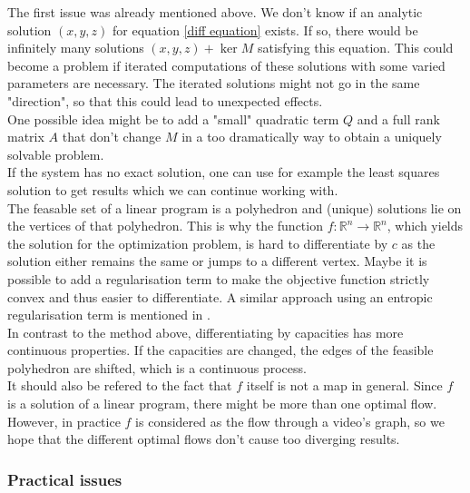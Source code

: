 \documentclass{article}
\begin{document}
{The first issue was already mentioned above. We don't know if an analytic solution $(x,y,z)$ for equation \eqref{diff equation} exists. If so, there would be infinitely many solutions $(x,y,z)+ \ker M$ satisfying this equation. This could become a problem if iterated computations of these solutions with some varied parameters are necessary. The iterated solutions might not go in the same "direction", so that this could lead to unexpected effects. \\
One possible idea might be to add a "small" quadratic term $Q$ and a full rank matrix $A$ that don't change $M$ in a too dramatically way to obtain a uniquely solvable problem.\\
If the system has no exact solution, one can use for example the least squares solution to get results which we can continue working with.\\
The feasable set of a linear program is a polyhedron and (unique) solutions lie on the vertices of that polyhedron. This is why the function $f:\mathbb R^n \rightarrow \mathbb R^n$, which yields the solution for the optimization problem, is hard to differentiate by $c$ as the solution either remains the same or jumps to a different vertex. Maybe it is possible to add a regularisation term to make the objective function strictly convex and thus easier to differentiate. A similar approach using an entropic regularisation term is mentioned in \cite{Cut13}. \\
In contrast to the method above, differentiating by capacities has more continuous properties. If the capacities are changed, the edges of the feasible polyhedron are shifted, which is a continuous process.\\
It should also be refered to the fact that $f$ itself is not a map in general. Since $f$ is a solution of a linear program, there might be more than one optimal flow. However, in practice $f$ is considered as the flow through a video's graph, so we hope that the different optimal flows don't cause too diverging results. 



\subsubsection{Practical issues}

}
\end{document}
